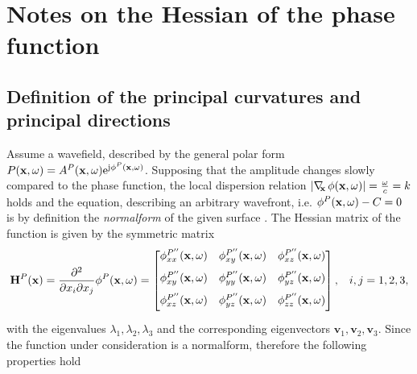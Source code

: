 \section{Notes on the Hessian of the phase function}
\label{App:Hessian}

\subsection{Definition of the principal curvatures and principal directions}
Assume a wavefield, described by the general polar form $P(\mathbf{x},\omega) = A^P(\mathbf{x},\omega)\mathrm{e}^{\mathrm{j} \phi^P (\mathbf{x},\omega)}$.
Supposing that the amplitude changes slowly compared to the phase function, the local dispersion relation $| \nabla_{\!\!\mathbf{x}}\, \phi(\mathbf{x},\omega) |= \frac{\omega}{c} = k$ holds and the equation, describing an arbitrary wavefront, i.e. $\phi^P(\mathbf{x},\omega) - C = 0$ is by definition the \emph{normalform} of the given surface \cite{Hartmann1999, Hartmann2001}.
The Hessian matrix of the function is given by the symmetric matrix
\begin{equation}
\label{Eq:App:Hessian}
\mathbf{H}^P(\mathbf{x}) =
\frac{\partial^2}{\partial x_i \partial x_j} \phi^P(\mathbf{x},\omega) 
=
 \begin{bmatrix} 
\phi^{P''}_{xx}(\mathbf{x},\omega) & \phi^{P''}_{xy}(\mathbf{x},\omega) & \phi^{P''}_{xz}(\mathbf{x},\omega) \\[.7em]
\phi^{P''}_{xy}(\mathbf{x},\omega) & \phi^{P''}_{yy}(\mathbf{x},\omega) & \phi^{P''}_{yz}(\mathbf{x},\omega) \\[.7em]
\phi^{P''}_{xz}(\mathbf{x},\omega) & \phi^{P''}_{yz}(\mathbf{x},\omega) & \phi^{P''}_{zz}(\mathbf{x},\omega) \\[0.5em]    \end{bmatrix}, \hspace{3mm} i,j = 1,2,3,
\end{equation}
with the eigenvalues $\lambda_1, \lambda_2, \lambda_3$ and the corresponding eigenvectors $\mathbf{v}_1, \mathbf{v}_2, \mathbf{v}_3$.
Since the function under consideration is a normalform, therefore the following properties hold
